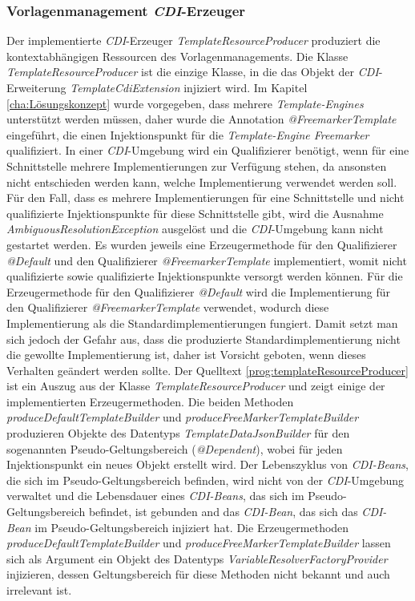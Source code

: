 \subsubsection{Vorlagenmanagement \emph{CDI}-Erzeuger}
Der implementierte \emph{CDI}-Erzeuger \emph{TemplateResourceProducer} produziert die kontextabhängigen Ressourcen des Vorlagenmanagements. Die Klasse \emph{TemplateResourceProducer} ist die einzige Klasse, in die das Objekt der \emph{CDI}-Erweiterung \emph{TemplateCdiExtension} injiziert wird. 
\newline
\newline
Im Kapitel \ref{cha:Lösungskonzept} wurde vorgegeben, dass mehrere \emph{Template-Engines} unterstützt werden müssen, daher wurde die Annotation \emph{@FreemarkerTemplate} eingeführt, die einen Injektionspunkt für die \emph{Template-Engine Freemarker} qualifiziert. In einer \emph{CDI}-Umgebung wird ein Qualifizierer benötigt, wenn für eine Schnittstelle mehrere Implementierungen zur Verfügung stehen, da ansonsten nicht entschieden werden kann, welche Implementierung verwendet werden soll. Für den Fall, dass es mehrere Implementierungen für eine Schnittstelle und nicht qualifizierte Injektionspunkte für diese Schnittstelle gibt, wird die Ausnahme \emph{AmbiguousResolutionException} ausgelöst und die \emph{CDI}-Umgebung kann nicht gestartet werden. 
\newline
\newline
Es wurden jeweils eine Erzeugermethode für den Qualifizierer \emph{@Default} und den Qualifizierer \emph{@FreemarkerTemplate} implementiert, womit nicht qualifizierte sowie qualifizierte Injektionspunkte versorgt werden können. Für die Erzeugermethode für den Qualifizierer \emph{@Default} wird die Implementierung für den Qualifizierer \emph{@FreemarkerTemplate} verwendet, wodurch diese Implementierung als die Standardimplementierungen fungiert. Damit setzt man sich jedoch der Gefahr aus, dass die produzierte Standardimplementierung nicht die gewollte Implementierung ist, daher ist Vorsicht geboten, wenn dieses Verhalten geändert werden sollte. 
\newline
\newline
Der Quelltext \ref{prog:templateResourceProducer} ist ein Auszug aus der Klasse \emph{TemplateResourceProducer} und zeigt einige der implementierten Erzeugermethoden. 
\newline
\newline
Die beiden Methoden \emph{produceDefaultTemplateBuilder} und \emph{produceFreeMarkerTemplateBuilder} produzieren Objekte des Datentyps  \emph{TemplateDataJsonBuilder} für den sogenannten Pseudo-Geltungsbereich (\emph{@Dependent}), wobei für jeden Injektionspunkt ein neues Objekt erstellt wird. Der Lebenszyklus von \emph{CDI-Beans}, die sich im Pseudo-Geltungsbereich befinden, wird nicht von der \emph{CDI}-Umgebung verwaltet und die Lebensdauer eines \emph{CDI-Beans}, das sich im Pseudo-Geltungsbereich befindet, ist gebunden and das \emph{CDI-Bean}, das sich das \emph{CDI-Bean} im Pseudo-Geltungsbereich injiziert hat. Die Erzeugermethoden \emph{produceDefaultTemplateBuilder} und \emph{produceFreeMarkerTemplateBuilder} lassen sich als Argument ein Objekt des Datentyps  \emph{VariableResolverFactoryProvider} injizieren, dessen Geltungsbereich für diese Methoden nicht bekannt und auch irrelevant ist.
